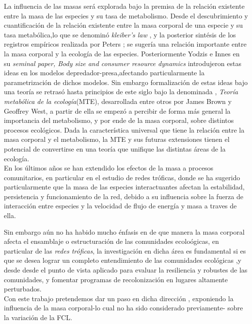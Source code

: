 La influencia de las masas ser\'a explorada bajo la premisa de la relaci\'on existente entre la masa de las especies y su tasa de metabolismo. Desde el descubrimiento y cuantificaci\'on de la relaci\'on existente entre la masa corporal de una especie y su tasa metab\'olica,lo que se denomin\'o \emph{kleiber's law} \citep{kleiber1961fire}, y la posterior sint\'esis de los registros emp\'iricos realizada por Peters \citep{peters1986ecological}; se suger\'ia una relaci\'on importante entre la masa corporal y la ecolog\'ia de las especies. Posteriormente Yodzis e Innes en su \emph{seminal paper, Body size and consumer resource dynamics}\citep{yodzis1992body} introdujeron estas ideas en los modelos depredador-presa,afectando particularmente la parametrizaci\'on de dichos modelos. Sin embargo formalizaci\'on de estas ideas bajo una teor\'ia se retras\'o hasta principios de este siglo bajo la denominada , \emph{Teor\'ia metab\'olica de la ecolog\'ia}(MTE), desarrollada entre otros por James Brown y Geoffrey West\citep{brown2004toward}, a partir de ella se empez\'o a percibir de forma m\'as general la importancia del metabolismo, y por ende de la masa corporal, sobre distintos procesos ecol\'ogicos. Dada la caracter\'istica universal que tiene la relaci\'on entre la masa corporal y el metabolismo, la MTE y sus futuras extensiones tienen el potencial de convertirse en una teor\'ia que unifique las distintas \'areas de la ecolog\'ia.\\

En los \'ultimos a\~nos se han extendido los efectos de la masa a procesos comunitarios, en particular en el estudio de redes tr\'oficas, donde se ha sugerido particularmente que la masa de las especies interactuantes afectan la estabilidad, persistencia y funcionamiento de la red, debido a su influencia sobre la fuerza de interacci\'on entre especies y la velocidad de flujo de energ\'ia y masa a traves de ella. \citep{brose2006allometric,mccann2011food}

Sin embargo a\'un no ha habido mucho \'enfasis en de que manera la masa corporal afecta el ensamblaje o estructuraci\'on de las comunidades ecolo\'ogicas, en particular de las \emph{redes tr\'oficas}, la investigaci\'on en dicha \'area es fundamental si es que se desea lograr un completo entendimiento de las comunidades ecol\'ogicas ,y desde desde el punto de vista aplicado para evaluar la resiliencia y robustes de las comunidades, y fomentar programas de recolonizaci\'on en lugares altamente perturbados.\\

Con este trabajo pretendemos dar un paso en dicha direcci\'on , exponiendo la influencia de la masa corporal-lo cual no ha sido considerado previamente- sobre la variaci\'on de la FCL.

